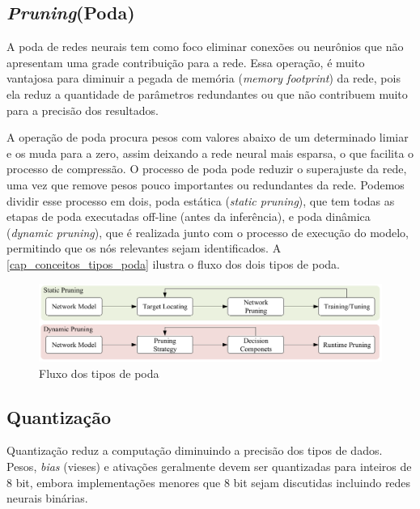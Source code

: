 \subsection{\textit{Pruning}(Poda)}\label{poda}

A poda de redes neurais tem como foco eliminar conexões ou neurônios que não apresentam uma grade contribuição para a
rede.
Essa operação, é muito vantajosa para diminuir a pegada de memória (\textit{memory footprint}) da rede, pois ela reduz
a quantidade de parâmetros redundantes ou que não contribuem muito para a precisão dos resultados.


A operação de poda procura pesos com valores abaixo de um determinado limiar e os muda para a zero, assim deixando
a rede neural mais esparsa, o que facilita o processo de compressão.
O processo de poda pode reduzir o superajuste da rede, uma vez que remove pesos pouco importantes ou redundantes
da rede.
Podemos dividir esse processo em dois, poda estática (\textit{static pruning}), que tem todas as etapas de poda
executadas off-line (antes da inferência), e poda dinâmica (\textit{dynamic pruning}), que é realizada junto com
o processo de execução do modelo, permitindo que os nós relevantes sejam identificados. A
\autoref{cap_conceitos_tipos_poda} ilustra o fluxo dos dois tipos de poda.

\begin{figure}[htb]
	\caption {\label{cap_conceitos_tipos_poda}Fluxo dos tipos de poda}
	\begin{center}
		\includegraphics[scale=0.5]{Imagens/categorias-poda}
	\end{center}
\end{figure}

\subsection{Quantização}\label{quantizacao}

Quantização reduz a computação diminuindo a precisão dos tipos de dados. Pesos, \textit{bias} (vieses) e ativações
geralmente devem ser quantizadas para inteiros de 8 bit, embora implementações menores que 8 bit sejam discutidas
incluindo redes neurais binárias. \cite{LIANG2021370}

